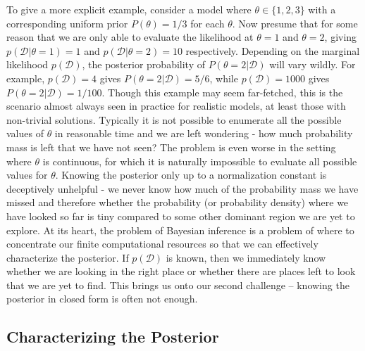 To give a more explicit example, consider a model where $\theta \in \{1,2,3\}$ with a corresponding uniform prior $P(\theta) = 1/3$
for each $\theta$.  Now presume that for some reason that we are only able to evaluate the likelihood at 
$\theta=1$ and $\theta=2$, giving $p(\mathcal{D}|\theta=1)=1$ and $p(\mathcal{D}|\theta=2)=10$ respectively.  Depending on the marginal
likelihood $p(\mathcal{D})$, the posterior probability of $P(\theta=2 | \mathcal{D})$ will vary wildly.  For example,
$p(\mathcal{D})=4$ gives $P(\theta=2 | \mathcal{D}) = 5/6$, while $p(\mathcal{D})=1000$ gives $P(\theta=2 | \mathcal{D}) = 1/100$.  Though this
example may seem far-fetched, this is the scenario almost always seen in practice for realistic
models, at least those with non-trivial solutions.   Typically it is not
possible to enumerate all the possible values of $\theta$ in reasonable time and we are left 
wondering - how much probability mass is left that we have not seen?  The problem is even worse 
in the setting where $\theta$ is continuous, for
which it is naturally impossible to evaluate all possible values for $\theta$.  
Knowing the posterior only up to a normalization constant is deceptively unhelpful - we never
know how much of the probability mass we have missed and therefore whether the probability (or
probability density) where we have looked so far is tiny compared to some other dominant region
we are yet to explore.  At its heart, the problem of Bayesian inference is a problem
of where to concentrate our finite computational resources so that we can effectively characterize
the posterior.  If $p(\mathcal{D})$ is known, then we immediately know whether we are looking in the right
place or whether there are places left to look that we are yet to find.  This brings us onto
our second challenge -- knowing the posterior in closed form is often not enough.

\subsection{Characterizing the Posterior}
\label{sec:inf:challenge:post}

